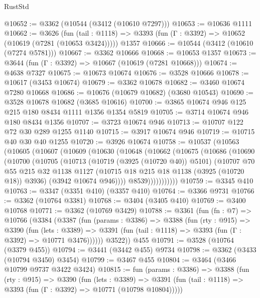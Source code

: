 \begin{lexlean}{RustStd}
\begin{coremodule}
@10652 := @3362 (@10544 (@3412 (@10610 @7297)))
@10653 := @10636 @1111
@10662 := @3626
    (fun (tail : @1118) => @3393 (fun (Γ : @3392) => @10652 (@10619 (@7281 (@10653 @3424)))))
    @1357
@10666 := @10544 (@3412 (@10610 (@7274 @5781)))
@10667 := @3362 @10666
@10668 := @10653 @1357
@10673 := @3644 (fun (Γ : @3392) => @10667 (@10619 (@7281 @10668)))
@10674 := @4638 @7327
@10675 := @10673 @10674
@10676 := @3528 @10666
@10678 := @10617 (@3453 @10674)
@10679 := @3362 @10678
@10682 := @3460 @10674 @7280 @10668
@10686 := @10676 (@10679 @10682) (@3680 @10543)
@10690 := @3528 @10678 @10682 (@3685 @10616)
@10700 := @3865 @10674 @946 @125 @215 @180 @8434 @1111 @1356 @1354 @5819
@10705 := @3714 @10674 @946 @180 @8434 @1356
@10707 := @3723 @10674 @946
@10713 := @10707 @122 @72 @30 @289 @1255 @1140
@10715 := @3917 @10674 @946
@10719 := @10715 @40 @30 @40 @1255
@10720 := @3926 @10674
@10758 := @10537
    (@10563
      (@10605
        (@10607
          (@10609
            (@10630
              (@10648
                (@10662
                  (@10675
                    (@10686
                      (@10690
                        (@10700
                          (@10705
                            (@10713
                              (@10719 (@3925 (@10720 @40)) @5101)
                              (@10707
                                @70
                                @55
                                @215
                                @32
                                @1138
                                @1127
                                (@10715 @18 @215 @18 @1138 (@3925 (@10720 @18)) @3936)
                                (@3942 @10674 @946))))
                          @8539)))))))))))
@10759 := @3345 @410
@10763 := @3347 (@3351 @410) (@3357 @410)
@10764 := @3366 @9731
@10766 := @3362 (@10764 @3381)
@10768 := @3404 (@3405 @410)
@10769 := @3400 @10768
@10771 := @3362 (@10769 @3429)
@10788 := @3361
    (fun (fn : @7) =>
    @10766
      (@3384
        (@3387
          (fun (params : @3386) =>
          @3388
            (fun (rty : @915) =>
            @3390
              (fun (lets : @3389) =>
              @3391 (fun (tail : @1118) => @3393 (fun (Γ : @3392) => @10771 @3476))))))
        @3522))
    @455
@10791 := @3528 (@10764 (@3379 @455))
@10794 := @3441 (@3442 @455) @9734
@10798 := @3362 (@3433 (@10794 @3450) @3454)
@10799 := @3467 @455
@10804 := @3464 (@3466 @10799 @9737 @3422 @3424)
@10815 := fun (params : @3386) =>
  @3388
    (fun (rty : @915) =>
    @3390
      (fun (lets : @3389) =>
      @3391 (fun (tail : @1118) => @3393 (fun (Γ : @3392) => @10771 (@10798 @10804)))))

\end{coremodule}
\end{lexlean}
